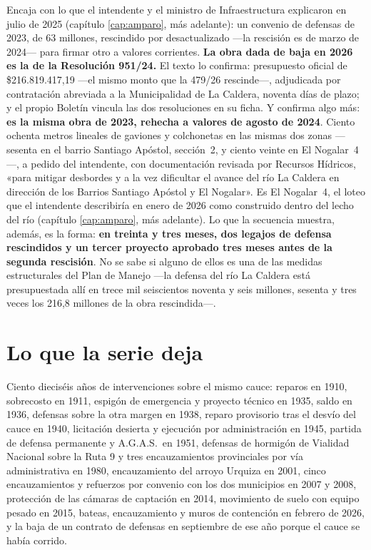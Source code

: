 Encaja con lo que el intendente y el ministro de Infraestructura explicaron en julio de 2025 (capítulo \ref{cap:amparo}, más adelante): un convenio de defensas de 2023, de 63 millones, rescindido por desactualizado ---la rescisión es de marzo de 2024--- para firmar otro a valores corrientes. \textbf{La obra dada de baja en 2026 es la de la Resolución 951/24.} El texto lo confirma: presupuesto oficial de \$216.819.417,19 ---el mismo monto que la 479/26 rescinde---, adjudicada por contratación abreviada a la Municipalidad de La Caldera, noventa días de plazo; y el propio Boletín vincula las dos resoluciones en su ficha. Y confirma algo más: \textbf{es la misma obra de 2023, rehecha a valores de agosto de 2024}. Ciento ochenta metros lineales de gaviones y colchonetas en las mismas dos zonas ---sesenta en el barrio Santiago Apóstol, sección~2, y ciento veinte en El Nogalar~4---, a pedido del intendente, con documentación revisada por Recursos Hídricos, «para mitigar desbordes y a la vez dificultar el avance del río La Caldera en dirección de los Barrios Santiago Apóstol y El Nogalar». Es El Nogalar~4, el loteo que el intendente describiría en enero de 2026 como construido dentro del lecho del río (capítulo \ref{cap:amparo}, más adelante). Lo que la secuencia muestra, además, es la forma: \textbf{en treinta y tres meses, dos legajos de defensa rescindidos y un tercer proyecto aprobado tres meses antes de la segunda rescisión}. No se sabe si alguno de ellos es una de las medidas estructurales del Plan de Manejo ---la defensa del río La Caldera está presupuestada allí en trece mil seiscientos noventa y seis millones, sesenta y tres veces los 216,8 millones de la obra rescindida---.

\section{Lo que la serie deja}

Ciento dieciséis años de intervenciones sobre el mismo cauce: reparos en 1910, sobrecosto en
1911, espigón de emergencia y proyecto técnico en 1935, saldo en 1936, defensas sobre la otra
margen en 1938, reparo provisorio tras el desvío del cauce en 1940, licitación desierta y ejecución por administración en 1945, partida de defensa permanente y A.G.A.S.\ en 1951, defensas de hormigón de Vialidad Nacional sobre la Ruta 9 y tres encauzamientos provinciales por vía administrativa en 1980, encauzamiento del arroyo Urquiza en 2001, cinco encauzamientos y refuerzos por convenio con los dos municipios en 2007 y 2008, protección de las cámaras de captación en 2014, movimiento de suelo con
equipo pesado en 2015, bateas, encauzamiento y muros de contención en febrero de 2026, y la baja de un contrato de defensas en septiembre de ese año porque el cauce se había corrido.

